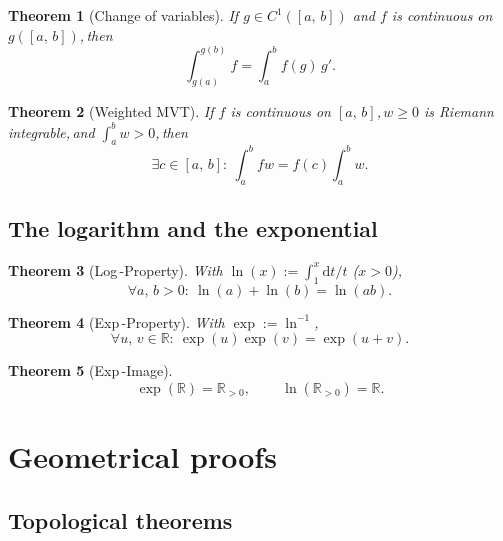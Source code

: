 \documentclass[11pt,reqno]{amsart}
\providecommand{\R}{\mathbb{R}}
\newcommand{\comma}{,\,\allowbreak}
\theoremstyle{redplain}
\newtheorem{theorem}{Theorem}
\begin{document}
\begin{theorem}[Change of variables]
	\label{thm:subst}
	If $g\in C^1([a\comma b])$ and $f$ is continuous on $g([a\comma b])$\comma then
	\begin{equation}\label{eq:subst}
	\int_{g(a)}^{g(b)}f=\int_a^b f(g)\,g'.
	\end{equation}
\end{theorem}

\begin{theorem}[Weighted MVT]
	\label{thm:weighted-mvt}
	If $f$ is continuous on $[a\comma b]$\comma $w\ge0$ is Riemann integrable\comma and $\int_a^b w>0$\comma then
	\begin{equation}\label{eq:weighted-mvt}
	\exists c\in[a\comma b]:\ \int_a^b fw=f(c)\int_a^b w.
	\end{equation}
\end{theorem}

\subsection{The logarithm and the exponential}

\begin{theorem}[Log\,-Property]
	\label{thm:log}
	With $\ln(x):=\int_1^x \mathrm{d}t/t$ ($x>0$)\comma
	\begin{equation}\label{eq:log}
	\forall a\comma b>0:\ \ln(a)+\ln(b)=\ln(ab).
	\end{equation}
\end{theorem}

\begin{theorem}[Exp\,-Property]
	\label{thm:exp}
	With $\exp:=\ln^{-1}$\comma
	\begin{equation}\label{eq:exp}
	\forall u\comma v\in\R:\ \exp(u)\exp(v)=\exp(u+v).
	\end{equation}
\end{theorem}

\begin{theorem}[Exp\,-Image]
	\label{thm:image}
	\begin{equation}\label{eq:image}
	\exp(\R)=\R_{>0}\comma\qquad \ln(\R_{>0})=\R.
	\end{equation}
\end{theorem}
\section{Geometrical proofs}
\subsection{Topological theorems}
\end{document}
